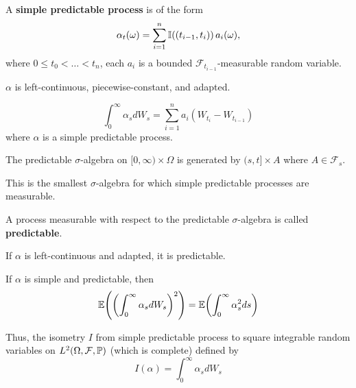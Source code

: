 \begin{defn}
  \label{defn:continuous_time:2}
  A \textbf{simple predictable process} is of the form
  \begin{equation}
    \label{eq:31}
    \alpha_{t}(\omega) = \sum_{i=1}^{n} \I{(t_{i-1}, t_{i})}
    a_{i}(\omega),
  \end{equation}
  where $0 \leq t_{0} < \dots < t_{n}$, each $a_{i}$ is a bounded
  $\mathcal{F}_{t_{i-1}}$-measurable random variable.
\end{defn}

\begin{remark}
  $\alpha$ is left-continuous, piecewise-constant, and adapted.
\end{remark}

\begin{defn}
  \label{defn:continuous_time:3}
  \begin{equation}
    \label{eq:30}
    \int_{0}^{\infty} \alpha_{s} dW_{s} = \sum_{i=1}^{n} a_{i}
    (W_{t_{i}} - W_{t_{i-1}})
  \end{equation} where $\alpha$ is a simple predictable process.
\end{defn}

\begin{defn}
  \label{defn:continuous_time:4}
  The predictable $\sigma$-algebra on $[0, \infty) \times \Omega$ is
  generated by $(s, t] \times A$ where $A \in \mathcal{F}_{s}$.

  This is the smallest $\sigma$-algebra for which simple predictable
  processes are measurable.

  A process measurable with respect to the predictable
  $\sigma$-algebra is called \textbf{predictable}.
\end{defn}

\begin{remark}
  If $\alpha$ is left-continuous and adapted, it is predictable.
\end{remark}

\begin{proposition}
  If $\alpha$ is simple and predictable, then
  \begin{equation}
    \label{eq:32}
    \E{\left(\int_{0}^{\infty}\alpha_{s} dW_{s} \right)^{2}} =
    \E{\int_{0}^{\infty} \alpha_{s}^{2} ds}
  \end{equation}


  Thus, the isometry $I$ from simple predictable process to square
  integrable random variables on $L^{2}(\Omega, \mathcal{F}, \Prob)$
  (which is complete) defined by
  \begin{equation}
    \label{eq:33}
    I(\alpha) = \int_{0}^{\infty} \alpha_{s} dW_{s}
  \end{equation}
\end{proposition}

